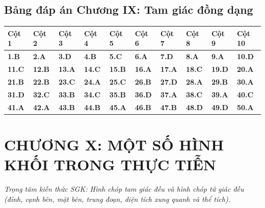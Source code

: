 \documentclass[11pt,a4paper]{article}
\begin{document}
\subsection*{\color{primary} Bảng đáp án Chương IX: Tam giác đồng dạng}
\begin{center}
\renewcommand{\arraystretch}{1.25}
\begin{tabularx}{\textwidth}{*{10}{>{\centering\arraybackslash}X}}
\toprule
\textbf{\color{primary} Cột 1} & \textbf{\color{primary} Cột 2} & \textbf{\color{primary} Cột 3} & \textbf{\color{primary} Cột 4} & \textbf{\color{primary} Cột 5} & \textbf{\color{primary} Cột 6} & \textbf{\color{primary} Cột 7} & \textbf{\color{primary} Cột 8} & \textbf{\color{primary} Cột 9} & \textbf{\color{primary} Cột 10} \\
\midrule
\textbf{1.B} & \textbf{2.A} & \textbf{3.D} & \textbf{4.B} & \textbf{5.C} & \textbf{6.A} & \textbf{7.D} & \textbf{8.A} & \textbf{9.A} & \textbf{10.D} \\
\rowcolor{rowtint} \textbf{11.C} & \textbf{12.B} & \textbf{13.A} & \textbf{14.C} & \textbf{15.B} & \textbf{16.A} & \textbf{17.A} & \textbf{18.C} & \textbf{19.D} & \textbf{20.A} \\
\textbf{21.B} & \textbf{22.B} & \textbf{23.C} & \textbf{24.A} & \textbf{25.C} & \textbf{26.B} & \textbf{27.D} & \textbf{28.A} & \textbf{29.B} & \textbf{30.A} \\
\rowcolor{rowtint} \textbf{31.D} & \textbf{32.C} & \textbf{33.B} & \textbf{34.C} & \textbf{35.B} & \textbf{36.D} & \textbf{37.A} & \textbf{38.C} & \textbf{39.A} & \textbf{40.C} \\
\textbf{41.A} & \textbf{42.A} & \textbf{43.B} & \textbf{44.B} & \textbf{45.A} & \textbf{46.B} & \textbf{47.B} & \textbf{48.D} & \textbf{49.D} & \textbf{50.A} \\
\bottomrule
\end{tabularx}
\end{center}\vspace{10pt}
\section*{\color{primary} CHƯƠNG X: MỘT SỐ HÌNH KHỐI TRONG THỰC TIỄN}
\textit{Trọng tâm kiến thức SGK: Hình chóp tam giác đều và hình chóp tứ giác đều (đỉnh, cạnh bên, mặt bên, trung đoạn, diện tích xung quanh và thể tích).}\par\vspace{4pt}
\end{document}
